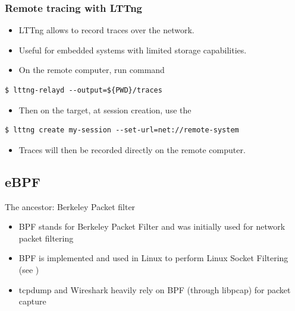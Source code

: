 \begin{frame}[fragile]
  \frametitle{Remote tracing with LTTng}
  \begin{itemize}
    \item LTTng allows to record traces over the network.
    \item Useful for embedded systems with limited storage capabilities.
    \item On the remote computer, run  command
  \end{itemize}
  \begin{block}{}
    \begin{verbatim}
$ lttng-relayd --output=${PWD}/traces
   \end{verbatim}
  \end{block}
  \begin{itemize}
    \item Then on the target, at session creation, use the 
  \end{itemize}
  \begin{block}{}
    \begin{verbatim}
$ lttng create my-session --set-url=net://remote-system
   \end{verbatim}
  \end{block}
  \begin{itemize}
    \item Traces will then be recorded directly on the remote computer.
  \end{itemize}
\end{frame}

\subsection{eBPF}

\begin{frame}{The ancestor: Berkeley Packet filter}
  \begin{itemize}
    \item BPF stands for Berkeley Packet Filter and was initially used
    for network packet filtering
    \item BPF is implemented and used in Linux to perform Linux Socket
    Filtering (see )
    \item tcpdump and Wireshark heavily rely on BPF (through libpcap) for
    packet capture
  \end{itemize}
\end{frame}

